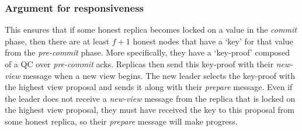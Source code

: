 \subsubsection{Argument for responsiveness}
This ensures that if some honest replica becomes locked on a value in the \textit{commit} phase, then there are at least $f + 1$ honest nodes that have a `key' for that value from the \textit{pre-commit} phase. More specifically, they have a `key-proof' composed of a QC over \textit{pre-commit} acks. Replicas then send this key-proof with their \textit{new-view} message when a new view begins. The new leader selects the key-proof with the highest view proposal and sends it along with their \textit{prepare} message. Even if the leader does not receive a \textit{new-view} message from the replica that is locked on the highest view proposal, they must have received the key to this proposal from some honest replica, so their \textit{prepare} message will make progress.

